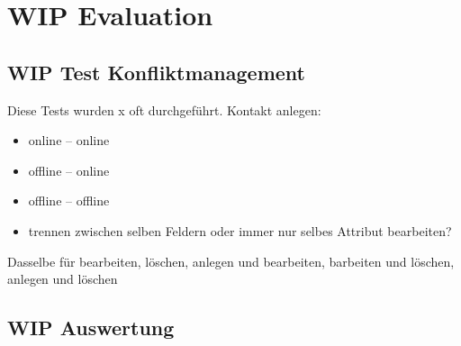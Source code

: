 \chapter{\label{chap:evaluation}WIP Evaluation}
%
\section{WIP Test Konfliktmanagement}
Diese Tests wurden x oft durchgeführt.
Kontakt anlegen:
\begin{itemize}
	\item online -- online
	\item offline -- online
	\item offline -- offline
	\item trennen zwischen selben Feldern oder immer nur selbes Attribut bearbeiten?
\end{itemize}
Dasselbe für bearbeiten, löschen,
anlegen und bearbeiten, barbeiten und löschen, anlegen und löschen\\

%
%
\section{WIP Auswertung}
